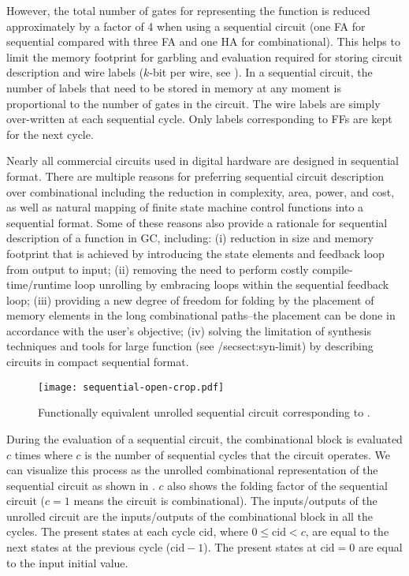 However, the total number of gates for representing the function is reduced approximately by a factor of 4 when using a sequential circuit (one FA for sequential compared with three FA and one HA for combinational).
This helps to limit the memory footprint for garbling and evaluation required for storing circuit description and wire labels ($k$-bit per wire, see ).
In a sequential circuit, the number of labels that need to be stored in memory at any moment is proportional to the number of gates in the circuit.
The wire labels are simply over-written at each sequential cycle.
Only labels corresponding to FFs are kept for the next cycle.

Nearly all commercial circuits used in digital hardware are designed in sequential format.
There are multiple reasons for preferring sequential circuit description over combinational including the reduction in complexity, area, power, and cost, as well as natural mapping of finite state machine control functions into a sequential format.
Some of these reasons also provide a rationale for sequential description of a function in GC, including: (i) reduction in size and memory footprint that is achieved by introducing the state elements and feedback loop from output to input; (ii) removing the need to perform costly compile-time/runtime loop unrolling by embracing loops within the sequential feedback loop; (iii) providing a new degree of freedom for folding by the placement of memory elements in the long combinational paths--the placement can be done in accordance with the user's objective; (iv) solving the limitation of synthesis techniques and tools for large function (see /sec{sect:syn-limit}) by describing circuits in compact sequential format.

\begin{figure}[ht]
    \centering
	\texttt{[image: sequential-open-crop.pdf]}
	\caption{Functionally equivalent unrolled sequential circuit corresponding to .}
	\label{fig:open-sequential}
\end{figure}

During the evaluation of a sequential circuit, the combinational block is evaluated $c$ times where $c$ is the number of sequential cycles that the circuit operates.
We can visualize this process as the unrolled combinational representation of the sequential circuit as shown in .
$c$ also shows the folding factor of the sequential circuit ($c=1$ means the circuit is combinational).
The inputs/outputs of the unrolled circuit are the inputs/outputs of the combinational block in all the cycles.
The present states at each cycle $\textrm{cid}$, where $0 \le \textrm{cid} < c$, are equal to the next states at the previous cycle ($\textrm{cid}-1$).
The present states at $\textrm{cid}=0$ are equal to the input initial value.

